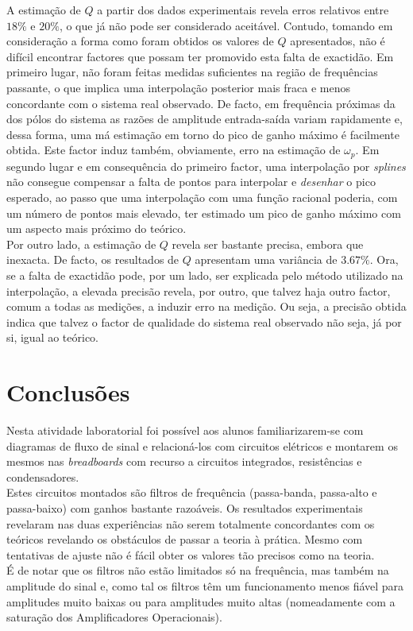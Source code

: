 \documentclass[a4paper,11pt]{report}
\begin{document}
A estimação de $Q$ a partir dos dados experimentais revela erros relativos entre $18\%$ e $20\%$, o que já não pode ser considerado aceitável. Contudo, tomando em consideração a forma como foram obtidos os valores de $Q$ apresentados, não é difícil encontrar factores que possam ter promovido esta falta de exactidão. Em primeiro lugar, não foram feitas medidas suficientes na região de frequências passante, o que implica uma interpolação posterior mais fraca e menos concordante com o sistema real observado. De facto, em frequência próximas da dos pólos do sistema as razões de amplitude entrada-saída variam rapidamente e, dessa forma, uma má estimação em torno do pico de ganho máximo é facilmente obtida. Este factor induz também, obviamente, erro na estimação de $\omega_p$. Em segundo lugar e em consequência do primeiro factor, uma interpolação por \textit{splines} não consegue compensar a falta de pontos para interpolar e \emph{desenhar} o pico esperado, ao passo que uma interpolação com uma função racional poderia, com um número de pontos mais elevado, ter estimado um pico de ganho máximo com um aspecto mais próximo do teórico.\\
Por outro lado, a estimação de $Q$ revela ser bastante precisa, embora que inexacta. De facto, os resultados de $Q$ apresentam uma variância de $3.67\%$. Ora, se a falta de exactidão pode, por um lado, ser explicada pelo método utilizado na interpolação, a elevada precisão revela, por outro, que talvez haja outro factor, comum a todas as medições, a induzir erro na medição. Ou seja, a precisão obtida indica que talvez o factor de qualidade do sistema real observado não seja, já por si, igual ao teórico.

\chapter{Conclusões}

Nesta atividade laboratorial foi possível aos alunos familiarizarem-se com diagramas de fluxo de sinal e relacioná-los com circuitos elétricos e montarem os mesmos nas \textit{breadboards} com recurso a circuitos integrados, resistências e condensadores.\\
Estes circuitos montados são filtros de frequência (passa-banda, passa-alto e passa-baixo) com ganhos bastante razoáveis.
Os resultados experimentais revelaram nas duas experiências não serem totalmente concordantes com os teóricos revelando os obstáculos de passar a teoria à prática. Mesmo com tentativas de ajuste não é fácil obter os valores tão precisos como na teoria.\\
É de notar que os filtros não estão limitados só na frequência, mas também na amplitude do sinal e, como tal os filtros têm um funcionamento menos fiável para amplitudes muito baixas ou para amplitudes muito altas (nomeadamente com a saturação dos Amplificadores Operacionais).
\end{document}
